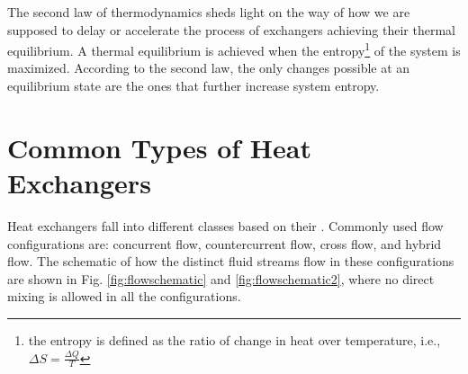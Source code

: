 The second law of thermodynamics sheds light on the way of how we are supposed to delay or accelerate the process of exchangers achieving their thermal equilibrium. A thermal equilibrium is achieved when the entropy\footnote{the entropy is defined as the ratio of change in heat over temperature, i.e., $\Delta S = \frac{\Delta Q}{T}$} of the system is maximized. According to the second law, the only changes possible at an equilibrium state are the ones that further increase system entropy.
\section{Common Types of Heat Exchangers}
Heat exchangers fall into different classes based on their . Commonly used flow configurations are: concurrent flow, countercurrent flow, cross flow, and hybrid flow. The schematic of how the distinct fluid streams flow in these configurations are shown in Fig. \ref{fig:flowschematic} and \ref{fig:flowschematic2}, where no direct mixing is allowed in all the configurations.
